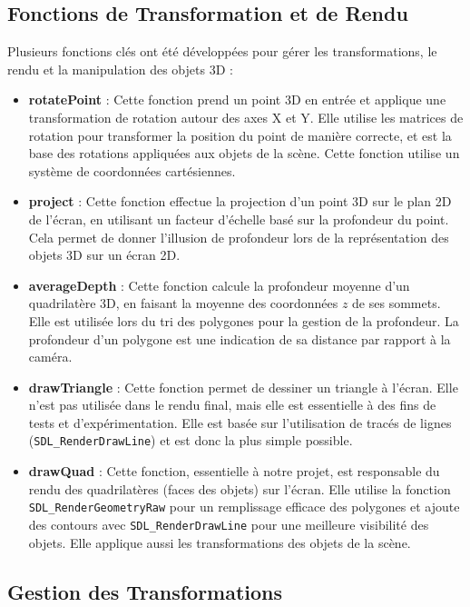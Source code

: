 \documentclass[12pt]{article}
\begin{document}
\subsection{Fonctions de Transformation et de Rendu}
\label{subsec:fonctions_transformations}

\noindent Plusieurs fonctions clés ont été développées pour gérer les transformations, le rendu et la manipulation des objets 3D :
\begin{itemize}
    \item \textbf{rotatePoint} : Cette fonction prend un point 3D en entrée et applique une transformation de rotation autour des axes X et Y. Elle utilise les matrices de rotation pour transformer la position du point de manière correcte, et est la base des rotations appliquées aux objets de la scène. Cette fonction utilise un système de coordonnées cartésiennes.
    \item \textbf{project} : Cette fonction effectue la projection d'un point 3D sur le plan 2D de l'écran, en utilisant un facteur d'échelle basé sur la profondeur du point. Cela permet de donner l'illusion de profondeur lors de la représentation des objets 3D sur un écran 2D.
    \item \textbf{averageDepth} : Cette fonction calcule la profondeur moyenne d'un quadrilatère 3D, en faisant la moyenne des coordonnées $z$ de ses sommets. Elle est utilisée lors du tri des polygones pour la gestion de la profondeur. La profondeur d'un polygone est une indication de sa distance par rapport à la caméra.
    \item \textbf{drawTriangle} : Cette fonction permet de dessiner un triangle à l'écran. Elle n'est pas utilisée dans le rendu final, mais elle est essentielle à des fins de tests et d'expérimentation. Elle est basée sur l'utilisation de tracés de lignes (\texttt{SDL\_RenderDrawLine}) et est donc la plus simple possible.
    \item \textbf{drawQuad} : Cette fonction, essentielle à notre projet, est responsable du rendu des quadrilatères (faces des objets) sur l'écran. Elle utilise la fonction \texttt{SDL\_RenderGeometryRaw} pour un remplissage efficace des polygones et ajoute des contours avec \texttt{SDL\_RenderDrawLine} pour une meilleure visibilité des objets. Elle applique aussi les transformations des objets de la scène.
\end{itemize}

\subsection{Gestion des Transformations}
\label{subsec:gestion_transformations}
\end{document}
